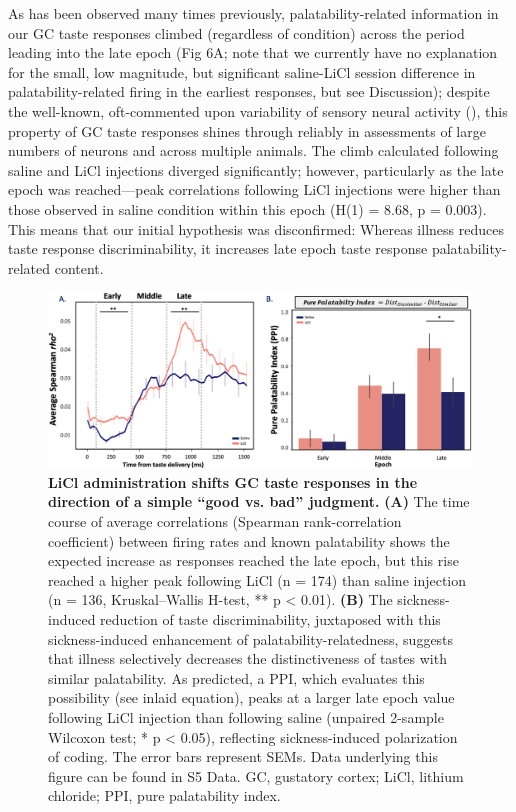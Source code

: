 \begin{refsection}
{As has been observed many times previously, palatability-related information in our GC taste responses climbed (regardless of condition) across the period leading into the late epoch (Fig 6A; note that we currently have no explanation for the small, low magnitude, but significant saline-LiCl session difference in palatability-related firing in the earliest responses, but see Discussion); despite the well-known, oft-commented upon variability of sensory neural activity (\cite{shadlen1998a,shadlen1994a}), this property of GC taste responses shines through reliably in assessments of large numbers of neurons and across multiple animals. The climb calculated following saline and LiCl injections diverged significantly; however, particularly as the late epoch was reached—peak correlations following LiCl injections were higher than those observed in saline condition within this epoch (H(1) = 8.68, p = 0.003). This means that our initial hypothesis was disconfirmed: Whereas illness reduces taste response discriminability, it increases late epoch taste response palatability-related content.

\begin{figure}
\includegraphics[width=\linewidth]{stone_2022_figs/journal.pbio.3001537.g006.png} 
\caption{\textbf{LiCl administration shifts GC taste responses in the direction of a simple “good vs. bad” judgment.}
\textbf{(A)} The time course of average correlations (Spearman rank-correlation coefficient) between firing rates and known palatability shows the expected increase as responses reached the late epoch, but this rise reached a higher peak following LiCl (n = 174) than saline injection (n = 136, Kruskal–Wallis H-test, ** p < 0.01). \textbf{(B)} The sickness-induced reduction of taste discriminability, juxtaposed with this sickness-induced enhancement of palatability-relatedness, suggests that illness selectively decreases the distinctiveness of tastes with similar palatability. As predicted, a PPI, which evaluates this possibility (see inlaid equation), peaks at a larger late epoch value following LiCl injection than following saline (unpaired 2-sample Wilcoxon test; * p < 0.05), reflecting sickness-induced polarization of coding. The error bars represent SEMs. Data underlying this figure can be found in S5 Data. GC, gustatory cortex; LiCl, lithium chloride; PPI, pure palatability index.
}
\label{fig:wrapfig}
\end{figure}


}
\end{refsection}
